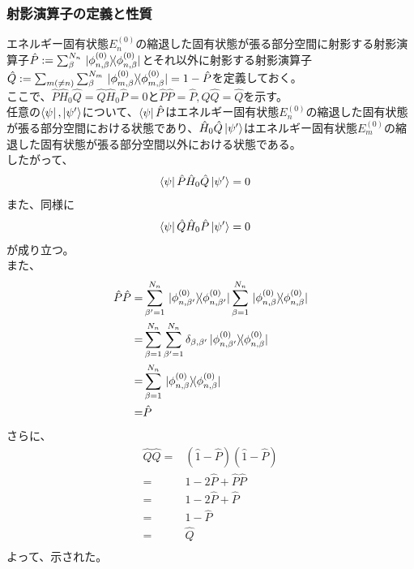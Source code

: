 \documentclass{ltjsarticle}
\begin{document}
\subsubsection{射影演算子の定義と性質}
エネルギー固有状態$E^{(0)}_{n}$の縮退した固有状態が張る部分空間に射影する射影演算子$\hat{P}:=\sum^{N_n}_\beta\ketbra*{\phi^{(0)}_{n,\beta}}{\phi^{(0)}_{n,\beta}}$とそれ以外に射影する射影演算子$\hat{Q}:=\sum_{m(\neq n)}\sum^{N_m}_\beta\ketbra*{\phi^{(0)}_{m,\beta}}{\phi^{(0)}_{m,\beta}}=1-\hat{P}$を定義しておく。\\
ここで、$\hat{P}\hat{H}_0\hat{Q}=\hat{Q}\hat{H}_0\hat{P}=0$と$\hat{P}\hat{P}=\hat{P},\hat{Q}\hat{Q}=\hat{Q}$を示す。\\
任意の$\bra{\psi},\ket{\psi'}$について、$\bra{\psi}\hat{P}$はエネルギー固有状態$E^{(0)}_{n}$の縮退した固有状態が張る部分空間における状態であり、$\hat{H}_0\hat{Q}\ket{\psi'}$はエネルギー固有状態$E^{(0)}_{m}$の縮退した固有状態が張る部分空間以外における状態である。\\
したがって、
\begin{align}
  \bra{\psi}\hat{P}\hat{H}_0\hat{Q}\ket{\psi'}&=0
\end{align}
また、同様に
\begin{align}
  \bra{\psi}\hat{Q}\hat{H}_0\hat{P}\ket{\psi'}&=0
\end{align}
が成り立つ。\\
また、
\begin{align}
  \hat{P}\hat{P}=&\sum_{\beta'=1}^{N_n}\ketbra*{\phi^{(0)}_{n,\beta'}}{\phi^{(0)}_{n,\beta'}}\sum_{\beta=1}^{N_n}\ketbra*{\phi^{(0)}_{n,\beta}}{\phi^{(0)}_{n,\beta}}\\
  =&\sum_{\beta=1}^{N_n}\sum_{\beta'=1}^{N_n}\delta_{\beta,\beta'}\ketbra*{\phi^{(0)}_{n,\beta'}}{\phi^{(0)}_{n,\beta}}\\
  =&\sum_{\beta=1}^{N_n}\ketbra*{\phi^{(0)}_{n,\beta}}{\phi^{(0)}_{n,\beta}}\\
  =&\hat{P}\\
\end{align}
さらに、
\begin{align}
  \hat{Q}\hat{Q}=&(\hat{1}-\hat{P})(\hat{1}-\hat{P})\\
  =&1-2\hat{P}+\hat{P}\hat{P}\\
  =&1-2\hat{P}+\hat{P}\\
  =&1-\hat{P}\\
  =&\hat{Q}\\
\end{align}
よって、示された。\\
\end{document}
